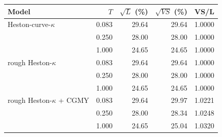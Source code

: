 \begin{tabular}{lrrrr}
\toprule
Model & $T$ & $\sqrt{L}$ (\%) & $\sqrt{VS}$ (\%) & VS/L\\
\midrule
Heston-curve-$\kappa$ & 0.083 & 29.64 & 29.64 & 1.0000\\
 & 0.250 & 28.00 & 28.00 & 1.0000\\
 & 1.000 & 24.65 & 24.65 & 1.0000\\
\addlinespace
rough Heston-$\kappa$ & 0.083 & 29.64 & 29.64 & 1.0000\\
 & 0.250 & 28.00 & 28.00 & 1.0000\\
 & 1.000 & 24.65 & 24.65 & 1.0000\\
\addlinespace
rough Heston-$\kappa$ + CGMY & 0.083 & 29.64 & 29.97 & 1.0221\\
 & 0.250 & 28.00 & 28.34 & 1.0248\\
 & 1.000 & 24.65 & 25.04 & 1.0320\\
\bottomrule
\end{tabular}
